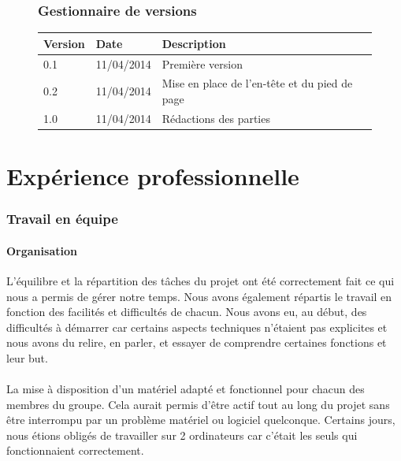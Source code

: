 \documentclass[12pt]{article}
\begin{document}
\cfoot{~\\~\thepage}
\setcounter{page}{2}
    	\begin{figure}[h]
        	\section*{Gestionnaire de versions}
		\centering
        	\begin{tabular}{|l|l|l|}
			\hline
            	\textbf{Version} & \textbf{Date} & \textbf{Description} \\
            	\hline
            		0.1 & 11/04/2014 & Première version \\
            	\hline
			0.2 & 11/04/2014 & Mise en place de l'en-tête et du pied de page \\
            	\hline
			1.0 & 11/04/2014 & Rédactions des parties \\
            	\hline
        	\end{tabular}
    	\end{figure}
\newpage

\renewcommand{\contentsname}{Sommaire}
\tableofcontents



\clearpage
\part*{Expérience professionnelle}
\section{Travail en équipe}
\subsection{Organisation}

	L'équilibre et la répartition des tâches du projet ont été correctement fait ce qui nous a permis de gérer notre temps. Nous avons également répartis le travail en fonction des facilités et difficultés de chacun. Nous avons eu, au début, des difficultés à démarrer car certains aspects techniques n'étaient pas explicites et nous avons du relire, en parler, et essayer de comprendre certaines fonctions et leur but.\\\\
	La mise à disposition d'un matériel adapté et fonctionnel pour chacun des membres du groupe. Cela aurait permis d'être actif tout au long du projet sans être interrompu par un problème matériel ou logiciel quelconque. Certains jours, nous étions obligés de travailler sur 2 ordinateurs car c'était les seuls qui fonctionnaient correctement.
\end{document}
